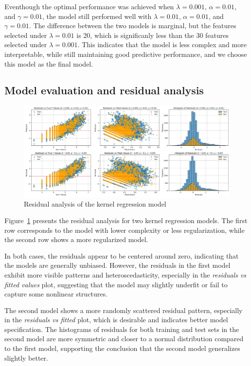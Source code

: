 \documentclass[12pt]{article}
\begin{document}
Eventhough the optimal performance was achieved when $\lambda = 0.001$, $\alpha = 0.01$, and $\gamma = 0.01$,
the model still performed well with $\lambda = 0.01$, $\alpha = 0.01$, and $\gamma = 0.01$.
The difference between the two models is marginal, but the features selected under $\lambda = 0.01$ is 20, which is 
significanly less than the 30 features selected under $\lambda = 0.001$.
This indicates that the model is less complex and more interpretable, while still maintaining good predictive performance, and 
we choose this model as the final model.

\subsection{Model evaluation and residual analysis}

\begin{figure}[!h]
    \centering
    \includegraphics[width=1\textwidth]{../results/kernel_residuals_analysis.png}
    \caption{Residual analysis of the kernel regression model}
    \label{fig:kernel_residuals}
\end{figure}

Figure~\ref{fig:kernel_residuals} presents the residual analysis for two kernel regression models. 
The first row corresponds to the model with lower complexity or less regularization, 
while the second row shows a more regularized model. 

In both cases, the residuals appear to be centered around zero, indicating that the models
 are generally unbiased. However, the residuals in the first model exhibit more visible patterns 
 and heteroscedasticity, especially in the \textit{residuals vs fitted values} plot, suggesting 
 that the model may slightly underfit or fail to capture some nonlinear structures.

The second model shows a more randomly scattered residual pattern, especially in the 
\textit{residuals vs fitted} plot, which is desirable and indicates better model specification. 
The histograms of residuals for both training and test sets in the second model are more symmetric 
and closer to a normal distribution compared to the first model, supporting the conclusion that
 the second model generalizes slightly better.
\end{document}
